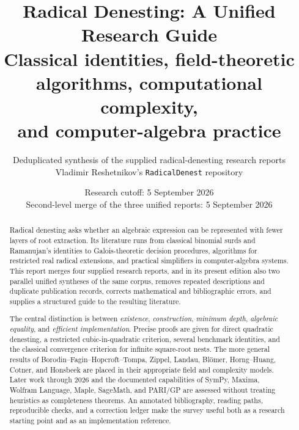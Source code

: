 \documentclass[11pt,oneside]{article}
\title{\bfseries Radical Denesting: A Unified Research Guide\\[0.35em]
\large Classical identities, field-theoretic algorithms, computational complexity,\\
\large and computer-algebra practice}
\author{Deduplicated synthesis of the supplied radical-denesting research reports\\
\small Vladimir Reshetnikov's \texttt{RadicalDenest} repository}
\date{Research cutoff: 5 September 2026\\
\small Second-level merge of the three unified reports: 5 September 2026}
\numberwithin{equation}{section}
\theoremstyle{definition}
\theoremstyle{remark}
\begin{document}
\maketitle

\begin{abstract}
Radical denesting asks whether an algebraic expression can be represented with fewer layers of root extraction. Its literature runs from classical binomial surds and Ramanujan's identities to Galois-theoretic decision procedures, algorithms for restricted real radical extensions, and practical simplifiers in computer-algebra systems. This report merges four supplied research reports, and in its present edition also two parallel unified syntheses of the same corpus, removes repeated descriptions and duplicate publication records, corrects mathematical and bibliographic errors, and supplies a structured guide to the resulting literature.

The central distinction is between \emph{existence}, \emph{construction}, \emph{minimum depth}, \emph{algebraic equality}, and \emph{efficient implementation}. Precise proofs are given for direct quadratic denesting, a restricted cubic-in-quadratic criterion, several benchmark identities, and the classical convergence criterion for infinite square-root nests. The more general results of Borodin--Fagin--Hopcroft--Tompa, Zippel, Landau, Bl\"omer, Horng--Huang, Cotner, and Honsbeek are placed in their appropriate field and complexity models. Later work through 2026 and the documented capabilities of SymPy, Maxima, Wolfram Language, Maple, SageMath, and PARI/GP are assessed without treating heuristics as completeness theorems. An annotated bibliography, reading paths, reproducible checks, and a correction ledger make the survey useful both as a research starting point and as an implementation reference.
\end{abstract}
\end{document}
